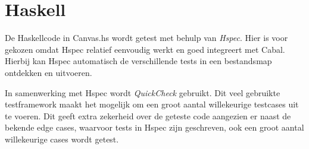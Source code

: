\section{Haskell}
De Haskellcode in Canvas.hs wordt getest met behulp van \emph{Hspec}. Hier is voor gekozen omdat Hspec relatief eenvoudig werkt en goed integreert met Cabal. Hierbij kan Hspec automatisch de verschillende tests in een bestandsmap ontdekken en uitvoeren.

In samenwerking met Hspec wordt \emph{QuickCheck} gebruikt. Dit veel gebruikte testframework maakt het mogelijk om een groot aantal willekeurige testcases uit te voeren. Dit geeft extra zekerheid over de geteste code aangezien er naast de bekende edge cases, waarvoor tests in Hspec zijn geschreven, ook een groot aantal willekeurige cases wordt getest.